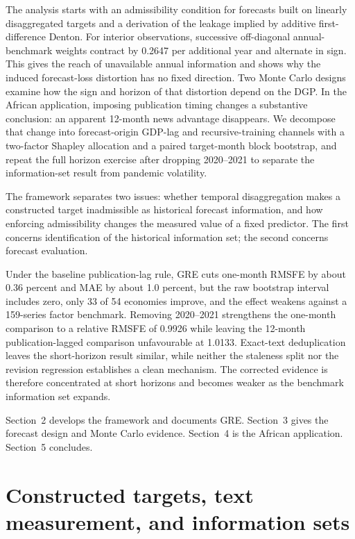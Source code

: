 \documentclass[preprint,12pt,authoryear]{elsarticle}
\begin{document}
The analysis starts with an admissibility condition for forecasts built on
linearly disaggregated targets and a derivation of the leakage implied by
additive first-difference Denton. For interior observations, successive
off-diagonal annual-benchmark weights contract by 0.2647 per additional year
and alternate in sign. This gives the reach of unavailable annual information
and shows why the induced forecast-loss distortion has no fixed direction. Two
Monte Carlo designs examine how the sign and horizon of that distortion depend
on the DGP. In the African application, imposing publication timing changes a
substantive conclusion: an apparent 12-month news advantage disappears. We
decompose that change into forecast-origin GDP-lag and recursive-training
channels with a two-factor Shapley allocation and a paired target-month block
bootstrap, and repeat the full horizon exercise after dropping 2020--2021 to
separate the information-set result from pandemic volatility.

The framework separates two issues: whether temporal disaggregation makes a
constructed target inadmissible as historical forecast information, and how
enforcing admissibility changes the measured value of a fixed predictor. The
first concerns identification of the historical information set; the second
concerns forecast evaluation.

Under the baseline publication-lag rule, GRE cuts one-month RMSFE by about
0.36 percent and MAE by about 1.0 percent, but the raw bootstrap interval
includes zero, only 33 of 54 economies improve, and the effect weakens against
a 159-series factor benchmark. Removing 2020--2021 strengthens the one-month
comparison to a relative RMSFE of 0.9926 while leaving the 12-month
publication-lagged comparison unfavourable at 1.0133. Exact-text deduplication
leaves the short-horizon result similar, while neither the staleness split nor
the revision regression establishes a clean mechanism. The corrected evidence
is therefore concentrated at short horizons and becomes weaker as the
benchmark information set expands.

Section~2 develops the framework and documents GRE. Section~3 gives the
forecast design and Monte Carlo evidence. Section~4 is the African
application. Section~5 concludes.

\section{Constructed targets, text measurement, and information sets}
\end{document}
